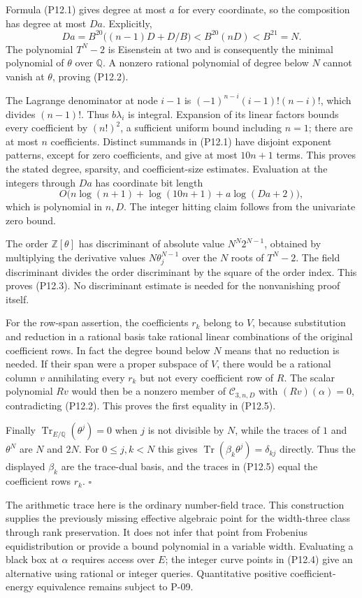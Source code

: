 \documentclass[11pt,a4paper]{article}
\theoremstyle{definition}\newtheorem{definition}{Definition}
\begin{document}
Formula (P12.1) gives degree at most $a$ for every coordinate, so the composition has degree at most $Da$.  Explicitly,
\[
 Da=B^{20}\bigl((n-1)D+D/B\bigr)
      <B^{20}(nD)<B^{21}=N.
\]
The polynomial $T^N-2$ is Eisenstein at two and is consequently the minimal polynomial of $\theta$ over $\mathbb Q$.  A nonzero rational polynomial of degree below $N$ cannot vanish at $\theta$, proving (P12.2).

The Lagrange denominator at node $i-1$ is
$(-1)^{n-i}(i-1)!(n-i)!$, which divides $(n-1)!$.  Thus $b\lambda_i$ is integral.  Expansion of its linear factors bounds every coefficient by $(n!)^2$, a sufficient uniform bound including $n=1$; there are at most $n$ coefficients.  Distinct summands in (P12.1) have disjoint exponent patterns, except for zero coefficients, and give at most $10n+1$ terms.  This proves the stated degree, sparsity, and coefficient-size estimates.  Evaluation at the integers through $Da$ has coordinate bit length
\[
 O\bigl(n\log(n+1)+\log(10n+1)+a\log(Da+2)\bigr),
\]
which is polynomial in $n,D$.  The integer hitting claim follows from the univariate zero bound.

The order $\mathbb Z[\theta]$ has discriminant of absolute value
$N^N2^{N-1}$, obtained by multiplying the derivative values
$N\theta_j^{N-1}$ over the $N$ roots of $T^N-2$.  The field discriminant divides the order discriminant by the square of the order index.  This proves (P12.3).  No discriminant estimate is needed for the nonvanishing proof itself.

For the row-span assertion, the coefficients $r_k$ belong to $V$, because substitution and reduction in a rational basis take rational linear combinations of the original coefficient rows.  In fact the degree bound below $N$ means that no reduction is needed.  If their span were a proper subspace of $V$, there would be a rational column $v$ annihilating every $r_k$ but not every coefficient row of $R$.  The scalar polynomial $Rv$ would then be a nonzero member of $\mathcal C_{3,n,D}$ with $(Rv)(\alpha)=0$, contradicting (P12.2).  This proves the first equality in (P12.5).

Finally $\operatorname{Tr}_{E/\mathbb Q}(\theta^j)=0$ when $j$ is not divisible by $N$, while the traces of $1$ and $\theta^N$ are $N$ and $2N$.  For $0\le j,k<N$ this gives
$\operatorname{Tr}(\beta_k\theta^j)=\delta_{kj}$ directly.  Thus the displayed $\beta_k$ are the trace-dual basis, and the traces in (P12.5) equal the coefficient rows $r_k$.  $\square$

The arithmetic trace here is the ordinary number-field trace.  This construction supplies the previously missing effective algebraic point for the width-three class through rank preservation.  It does not infer that point from Frobenius equidistribution or provide a bound polynomial in a variable width.  Evaluating a black box at $\alpha$ requires access over $E$; the integer curve points in (P12.4) give an alternative using rational or integer queries.  Quantitative positive coefficient-energy equivalence remains subject to P-09.
\end{document}
